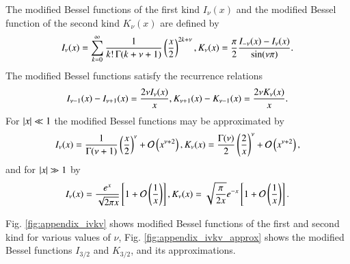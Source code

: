 The modified Bessel functions of the first kind $I_\nu(x)$ and the modified Bessel
function of the second kind $K_\nu(x)$ are defined by
\begin{equation}
I_\nu(x) = \sum_{k=0}^\infty \frac{1}{k! \, \Gamma(k+\nu+1)} \left(\frac{x}{2}\right)^{2k+\nu}, \\
K_\nu(x) = \frac{\pi}{2} \frac{I_{-\nu} (x) - I_\nu (x)}{\sin (\nu \pi)}. 
\end{equation}
The modified Bessel functions satisfy the recurrence relations
\begin{equation}
\label{eq_appendix_bessel_recurrence}
I_{\nu-1}(x) - I_{\nu+1}(x) = \frac{2\nu I_\nu(x)}{x}, \\
K_{\nu+1}(x) - K_{\nu-1}(x) = \frac{2\nu K_\nu(x)}{x}.
\end{equation}
For $\left|x\right| \ll 1$ the modified Bessel functions may be approximated by
\begin{equation}
\label{eq:appendix_bessel_approx_small}
I_\nu(x) = \frac{1}{\Gamma(\nu+1)} \left( \frac{x}{2} \right) ^\nu + \mathcal{O}\left(x^{\nu+2}\right), \\
K_\nu(x) = \frac{\Gamma(\nu)}{2} \left( \frac{2}{x} \right) ^\nu + \mathcal{O}\left(x^{\nu+2}\right),
\end{equation}
and for $\left|x\right| \gg 1$ by
\begin{equation}
\label{eq:appendix_bessel_approx_large}
I_\nu(x) = \frac{e^x}{\sqrt{2\pi x}} \left[ 1+\mathcal{O}\left(\frac{1}{x}\right) \right], \\
K_\nu(x) = \sqrt{\frac{\pi}{2x}} e^{-x} \left[ 1+\mathcal{O}\left(\frac{1}{x}\right) \right].
\end{equation}

Fig. \ref{fig:appendix_ivkv} shows modified Bessel functions of the first and second kind for various values of $\nu$,
Fig. \ref{fig:appendix_ivkv_approx} shows the modified Bessel functions $I_{3/2}$ and $K_{3/2}$, and its approximations.

